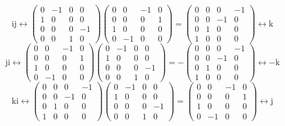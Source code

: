 \documentclass[
]{book}
\theoremstyle{definition}
\theoremstyle{definition}
\theoremstyle{definition}
\theoremstyle{definition}
\theoremstyle{remark}
\begin{document}
\[
\mathrm{i}\mathrm{j}\leftrightarrow\begin{pmatrix}0 & -1 & 0 & 0\\
1 & 0 & 0 & 0\\
0 & 0 & 0 & -1\\
0 & 0 & 1 & 0
\end{pmatrix}\begin{pmatrix}0 & 0 & -1 & 0\\
0 & 0 & 0 & 1\\
1 & 0 & 0 & 0\\
0 & -1 & 0 & 0
\end{pmatrix}=\begin{pmatrix}0 & 0 & 0 & -1\\
0 & 0 & -1 & 0\\
0 & 1 & 0 & 0\\
1 & 0 & 0 & 0
\end{pmatrix}\leftrightarrow\mathrm{k}
\]
\[
\mathrm{j}\mathrm{i}\leftrightarrow\begin{pmatrix}0 & 0 & -1 & 0\\
0 & 0 & 0 & 1\\
1 & 0 & 0 & 0\\
0 & -1 & 0 & 0
\end{pmatrix}\begin{pmatrix}0 & -1 & 0 & 0\\
1 & 0 & 0 & 0\\
0 & 0 & 0 & -1\\
0 & 0 & 1 & 0
\end{pmatrix}=-\begin{pmatrix}0 & 0 & 0 & -1\\
0 & 0 & -1 & 0\\
0 & 1 & 0 & 0\\
1 & 0 & 0 & 0
\end{pmatrix}\leftrightarrow-\mathrm{k}
\]
\[
\mathrm{k}\mathrm{i}\leftrightarrow\begin{pmatrix}0 & 0 & 0 & -1\\
0 & 0 & -1 & 0\\
0 & 1 & 0 & 0\\
1 & 0 & 0 & 0
\end{pmatrix}\begin{pmatrix}0 & -1 & 0 & 0\\
1 & 0 & 0 & 0\\
0 & 0 & 0 & -1\\
0 & 0 & 1 & 0
\end{pmatrix}=\begin{pmatrix}0 & 0 & -1 & 0\\
0 & 0 & 0 & 1\\
1 & 0 & 0 & 0\\
0 & -1 & 0 & 0
\end{pmatrix}\leftrightarrow\mathrm{j}
\]
\end{document}
